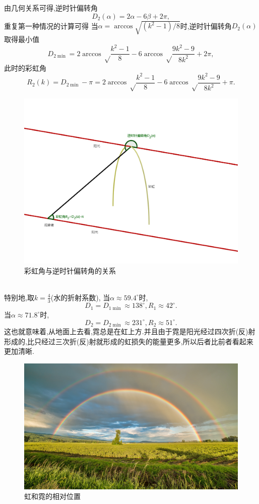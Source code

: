 \documentclass[a4paper]{article}%
\begin{document}
由几何关系可得,逆时针偏转角
\[D_2(\alpha)=2\alpha-6\beta+2\pi,\]
重复第一种情况的计算可得
当$\alpha=\arccos\sqrt{(k^2-1)/8}$时,逆时针偏转角$D_2(\alpha)$取得最小值
\[D_{2\min}=2\arccos\sqrt\frac{k^2-1}{8}-6\arccos\sqrt\frac{9k^2-9}{8k^2}+2\pi,\]
此时的彩虹角
\[R_2(k)=D_{2\min}-\pi=2\arccos\sqrt\frac{k^2-1}{8}-6\arccos\sqrt\frac{9k^2-9}{8k^2}+\pi.\]
\begin{figure}[ht]
   \centering
   \includegraphics[scale=0.14]{图4}
   \caption[图4]{彩虹角与逆时针偏转角的关系}\label{fig-图4}
   \end{figure}
   \\
特别地,取$k=\frac{4}{3}$(水的折射系数),
当$\alpha\approx 59.4^{\circ }$时,
\[D_1=D_{1\min}\approx 138^{\circ },R_1\approx 42^{\circ }.\]
当$\alpha\approx 71.8^{\circ }$时,
\[D_2=D_{2\min}\approx 231^{\circ },R_2\approx 51^{\circ }.\]
这也就意味着,从地面上去看,霓总是在虹上方.并且由于霓是阳光经过四次折(反)射形成的,比只经过三次折(反)射就形成的虹损失的能量更多,所以后者比前者看起来更加清晰.
\begin{figure}[ht]
   \centering
   \includegraphics[scale=0.12]{图5}
   \caption[图5]{虹和霓的相对位置}\label{fig-图5}
   \end{figure}
\end{document}
